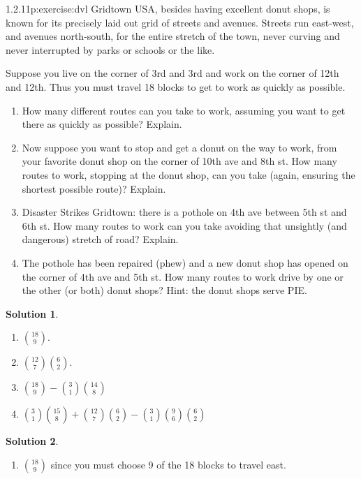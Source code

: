 \documentclass[twoside,11pt,]{book}
\newcommand{\blocktitlefont}{\relax}
\numberwithin{equation}{chapter}
\begin{document}
\begin{divisionsolution}{1.2.11}{}{p:exercise:dvl}%
Gridtown USA, besides having excellent donut shops, is known for its precisely laid out grid of streets and avenues. Streets run east-west, and avenues north-south, for the entire stretch of the town, never curving and never interrupted by parks or schools or the like.%
\par
Suppose you live on the corner of 3rd and 3rd and work on the corner of 12th and 12th. Thus you must travel 18 blocks to get to work as quickly as possible.%
\begin{enumerate}[label=(\alph*)]
\item{}How many different routes can you take to work, assuming you want to get there as quickly as possible? Explain.%
\item{}Now suppose you want to stop and get a donut on the way to work, from your favorite donut shop on the corner of 10th ave and 8th st. How many routes to work, stopping at the donut shop, can you take (again, ensuring the shortest possible route)? Explain.%
\item{}Disaster Strikes Gridtown: there is a pothole on 4th ave between 5th st and 6th st. How many routes to work can you take avoiding that unsightly (and dangerous) stretch of road? Explain.%
\item{}The pothole has been repaired (phew) and a new donut shop has opened on the corner of 4th ave and 5th st. How many routes to work drive by one or the other (or both) donut shops? Hint: the donut shops serve PIE.%
\end{enumerate}
%
\par\smallskip%
\noindent\textbf{\blocktitlefont Solution 1}.\quad{}%
\begin{enumerate}[label=(\alph*)]
\item{}\({18 \choose 9}\).%
\item{}\(\binom{12}{7}\binom{6}{2}\).%
\item{}\({18 \choose 9} - {3 \choose 1}{14 \choose 8}\)%
\item{}\({3\choose 1}{15 \choose 8} + {12 \choose 7}{6 \choose 2} - {3\choose 1}{9 \choose 6}{6 \choose 2}\)%
\end{enumerate}
%
\par\smallskip%
\noindent\textbf{\blocktitlefont Solution 2}.\quad{}%
\begin{enumerate}[label=(\alph*)]
\item{}\({18 \choose 9}\) since you must choose 9 of the 18 blocks to travel east.%

\end{enumerate}
\end{divisionsolution}
\end{document}
